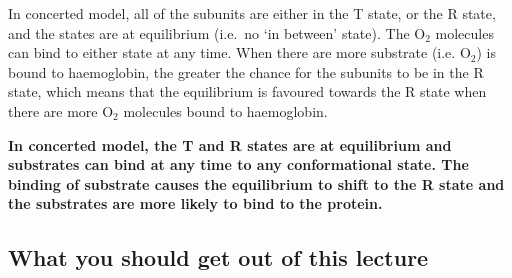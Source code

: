 In concerted model, all of the subunits are either in the T state, or the R state, and the states are at equilibrium (i.e.\  no `in between' state).
The O$_2$ molecules can bind to either state at any time.
When there are more substrate (i.e. O$_2$) is bound to haemoglobin, the greater the chance for the subunits to be in the R state, which means that the equilibrium is favoured towards the R state when there are more O$_2$ molecules bound to haemoglobin.

\textbf{In concerted model, the T and R states are at equilibrium and substrates can bind at any time to any conformational state. The binding of substrate causes the equilibrium to shift to the R state and the substrates are more likely to bind to the protein.}

\begin{center}
\end{center}

\subsection*{What you should get out of this lecture}


